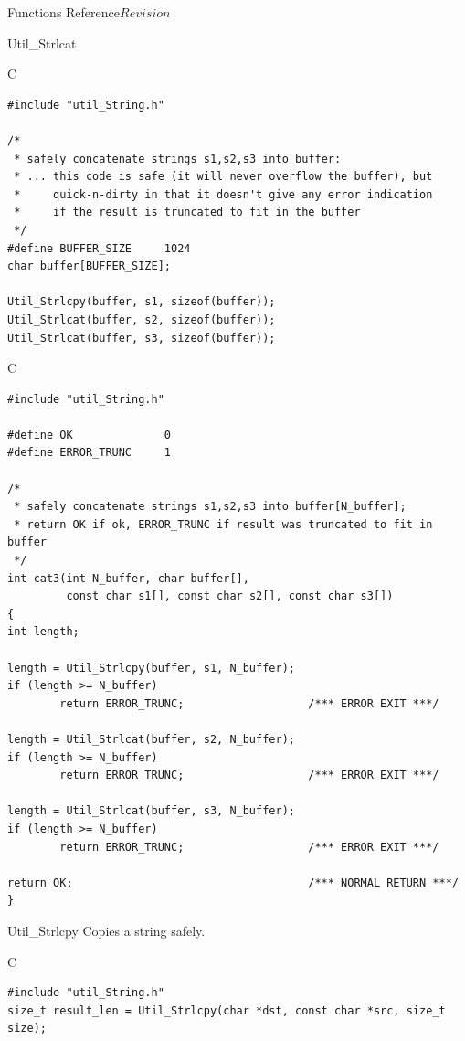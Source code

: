 \begin{cactuspart}{ Functions Reference}{}{$Revision$}
\begin{FunctionDescription}{Util\_Strlcat}
\begin{ExampleSection}
\begin{Example}{C}
\begin{verbatim}
#include "util_String.h"

/*
 * safely concatenate strings s1,s2,s3 into buffer:
 * ... this code is safe (it will never overflow the buffer), but
 *     quick-n-dirty in that it doesn't give any error indication
 *     if the result is truncated to fit in the buffer
 */
#define BUFFER_SIZE     1024
char buffer[BUFFER_SIZE];

Util_Strlcpy(buffer, s1, sizeof(buffer));
Util_Strlcat(buffer, s2, sizeof(buffer));
Util_Strlcat(buffer, s3, sizeof(buffer));
\end{verbatim}
\end{Example}
\begin{Example}{C}
\begin{verbatim}
#include "util_String.h"

#define OK              0
#define ERROR_TRUNC     1

/*
 * safely concatenate strings s1,s2,s3 into buffer[N_buffer];
 * return OK if ok, ERROR_TRUNC if result was truncated to fit in buffer
 */
int cat3(int N_buffer, char buffer[],
         const char s1[], const char s2[], const char s3[])
{
int length;

length = Util_Strlcpy(buffer, s1, N_buffer);
if (length >= N_buffer)
        return ERROR_TRUNC;                   /*** ERROR EXIT ***/

length = Util_Strlcat(buffer, s2, N_buffer);
if (length >= N_buffer)
        return ERROR_TRUNC;                   /*** ERROR EXIT ***/

length = Util_Strlcat(buffer, s3, N_buffer);
if (length >= N_buffer)
        return ERROR_TRUNC;                   /*** ERROR EXIT ***/

return OK;                                    /*** NORMAL RETURN ***/
}
\end{verbatim}
\end{Example}
\end{ExampleSection}
\end{FunctionDescription}


\begin{FunctionDescription}{Util\_Strlcpy}
\label{Util-Strlcpy}
Copies a string safely.

\begin{SynopsisSection}
\begin{Synopsis}{C}
\begin{verbatim}
#include "util_String.h"
size_t result_len = Util_Strlcpy(char *dst, const char *src, size_t size);
\end{verbatim}
\end{Synopsis}
\end{SynopsisSection}


\end{FunctionDescription}
\end{cactuspart}
